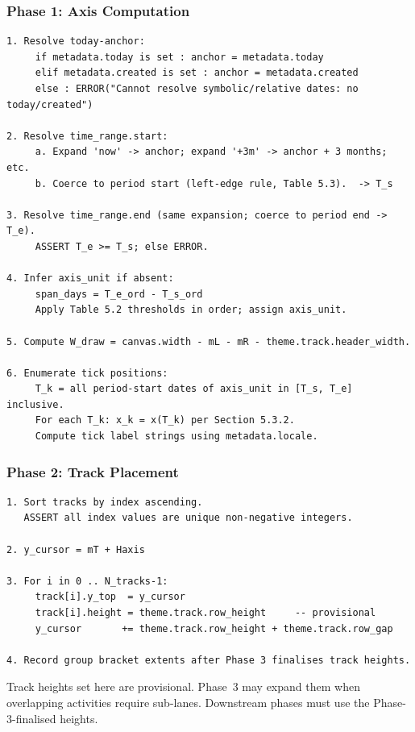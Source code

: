 \subsubsection{Phase 1: Axis Computation}
\label{sec:phase1}

\begin{lstlisting}[caption={Phase 1: Axis computation}]
1. Resolve today-anchor:
     if metadata.today is set : anchor = metadata.today
     elif metadata.created is set : anchor = metadata.created
     else : ERROR("Cannot resolve symbolic/relative dates: no today/created")

2. Resolve time_range.start:
     a. Expand 'now' -> anchor; expand '+3m' -> anchor + 3 months; etc.
     b. Coerce to period start (left-edge rule, Table 5.3).  -> T_s

3. Resolve time_range.end (same expansion; coerce to period end -> T_e).
     ASSERT T_e >= T_s; else ERROR.

4. Infer axis_unit if absent:
     span_days = T_e_ord - T_s_ord
     Apply Table 5.2 thresholds in order; assign axis_unit.

5. Compute W_draw = canvas.width - mL - mR - theme.track.header_width.

6. Enumerate tick positions:
     T_k = all period-start dates of axis_unit in [T_s, T_e] inclusive.
     For each T_k: x_k = x(T_k) per Section 5.3.2.
     Compute tick label strings using metadata.locale.
\end{lstlisting}

\subsubsection{Phase 2: Track Placement}
\label{sec:phase2}

\begin{lstlisting}[caption={Phase 2: Track placement}]
1. Sort tracks by index ascending.
   ASSERT all index values are unique non-negative integers.

2. y_cursor = mT + Haxis

3. For i in 0 .. N_tracks-1:
     track[i].y_top  = y_cursor
     track[i].height = theme.track.row_height     -- provisional
     y_cursor       += theme.track.row_height + theme.track.row_gap

4. Record group bracket extents after Phase 3 finalises track heights.
\end{lstlisting}

Track heights set here are provisional. Phase~3 may expand them when overlapping activities
require sub-lanes. Downstream phases must use the Phase-3-finalised heights.

